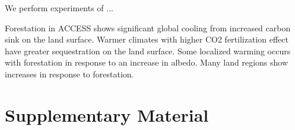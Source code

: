 \documentclass[]{article}
\begin{document}
We perform experiments of ...

Forestation in ACCESS shows significant global cooling from increased carbon sink on the land surface.
Warmer climates with higher CO2 fertilization effect have greater sequestration on the land surface.
Some localized warming occurs with forestation in response to an increase in albedo. 
Many land regions show increases in response to forestation.

\printbibliography

\section{Supplementary Material}
\setcounter{figure}{0}
\end{document}
